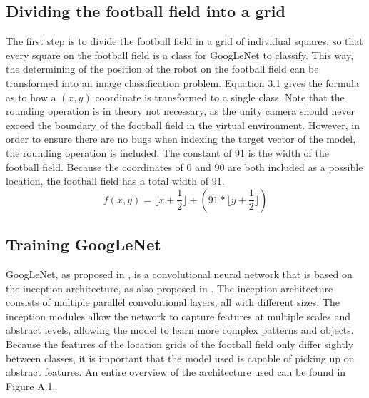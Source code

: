 \documentclass{uva-inf-bachelor-thesis}
\begin{document}
        \subsection{Dividing the football field into a grid}
            The first step is to divide the football field in a grid of individual squares, so that every square on the football field is a class for GoogLeNet to classify. This way, the determining of the position of the robot on the football field can be transformed into an image classification problem. 
            Equation 3.1 gives the formula as to how a $(x, y)$ coordinate is transformed to a single class. Note that the rounding operation is in theory not necessary, as the unity camera should never exceed the boundary of the football field in the virtual environment. However, in order to ensure there are no bugs when indexing the target vector of the model, the rounding operation is included. The constant of 91 is the width of the football field. Because the coordinates of 0 and 90 are both included as a possible location, the football field has a total width of 91.
            \begin{equation}
                f(x, y) = \lfloor{x + \frac{1}{2}} \rfloor + (91 * \lfloor y + \frac{1}{2} \rfloor)
            \end{equation}

        \subsection{Training GoogLeNet}
            GoogLeNet, as proposed in \cite{googlenet}, is a convolutional neural network that is based on the inception architecture, as also proposed in \cite{googlenet}. The inception architecture consists of multiple parallel convolutional layers, all with different sizes. The inception modules allow the network to capture features at multiple scales and abstract levels, allowing the model to learn more complex patterns and objects. Because the features of the location grids of the football field only differ sightly between classes, it is important that the model used is capable of picking up on abstract features. An entire overview of the architecture used can be found in Figure A.1.
            
\end{document}
